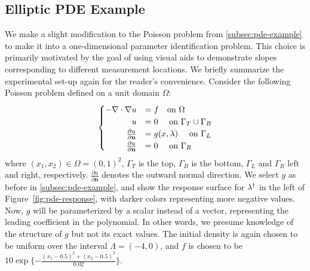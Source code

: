 \subsection{Elliptic PDE Example}\label{sec:pde-oed-example}
We make a slight modification to the Poisson problem from \ref{subsec:pde-example} to make it into a one-dimensional parameter identification problem.
This choice is primarily motivated by the goal of using visual aids to demonstrate slopes corresponding to different measurement locations.
We briefly summarize the experimental set-up again for the reader's convenience.
Consider the following Poisson problem defined on a unit domain $\Omega$:
\begin{equation}\label{eq:pde-equation-1d}
\begin{cases}
\hfill -\nabla \cdot \nabla u &= f \quad\text{on } \Omega \\
\hfill u &= 0 \quad\text{ on } \Gamma_T \cup \Gamma_B \\
\hfill \frac{\partial u}{\partial \mathbf{n}} &= g(x,\param) \quad\text{ on } \Gamma_L \\
\hfill \frac{\partial u}{\partial \mathbf{n}} &= 0 \quad\text{ on } \Gamma_R
\end{cases}
\end{equation}
where $(x_1, x_2) \in \Omega = (0,1)^2$, $\Gamma_T$ is the top, $\Gamma_B$ is the bottom, $\Gamma_L$ and $\Gamma_R$ left and right, respectively.
$\frac{\partial u}{\partial \mathbf{n}}$ denotes the outward normal direction.
We select $g$ as before in \ref{subsec:pde-example}, and show the response surface for $\lambda^\dagger$ in the left of Figure~\ref{fig:pde-response}, with darker colors representing more negative values.
Now, $g$ will be parameterized by a scalar instead of a vector, representing the leading coefficient in the polynomial.
In other words, we presume knowledge of the structure of $g$ but not its exact values.
The initial density is again chosen to be uniform over the interval $\Lambda = (-4, 0)$, and $f$ is chosen to be $10\exp\{-\frac{(x_1-0.5)^2 + (x_2 - 0.5)^2}{0.02}\}$.


